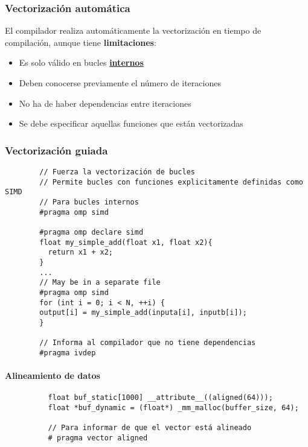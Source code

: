\documentclass{article}
\begin{document}
    \subsubsection{Vectorización automática}
      El compilador realiza automáticamente la vectorización en tiempo de
      compilación, aunque tiene \textbf{limitaciones}:
      \begin{itemize}
        \item Es solo válido en bucles \textbf{\underline{internos}}
        \item Deben conocerse previamente el número de iteraciones
        \item No ha de haber dependencias entre iteraciones
        \item Se debe especificar aquellas funciones que están vectorizadas
      \end{itemize}

    \subsubsection{Vectorización guiada}
      \begin{verbatim}
        // Fuerza la vectorización de bucles
        // Permite bucles con funciones explicitamente definidas como SIMD
        // Para bucles internos
        #pragma omp simd

        #pragma omp declare simd
        float my_simple_add(float x1, float x2){
          return x1 + x2;
        }
        ...
        // May be in a separate file
        #pragma omp simd
        for (int i = 0; i < N, ++i) {
        output[i] = my_simple_add(inputa[i], inputb[i]);
        }

        // Informa al compilador que no tiene dependencias
        #pragma ivdep
      \end{verbatim}

      \paragraph{Alineamiento de datos}

        \begin{verbatim}
          float buf_static[1000] __attribute__((aligned(64)));
          float *buf_dynamic = (float*) _mm_malloc(buffer_size, 64);

          // Para informar de que el vector está alineado
          # pragma vector aligned
        \end{verbatim}
\end{document}
